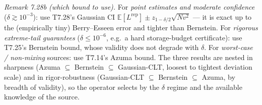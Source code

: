 \documentclass[
]{article}
\begin{document}
\emph{Remark 7.28b (which bound to use).} For \emph{point estimates and
moderate confidence} ($\delta \gtrsim 10^{-3}$): use T7.28's Gaussian
CI $\mathbb{E}[L^{\mathrm{rep}}] \pm z_{1-\delta/2}\sqrt{N v^2}$ --- it
is exact up to the (empirically tiny) Berry--Esseen error and tighter
than Bernstein. For \emph{rigorous extreme-tail guarantees}
($\delta \leq 10^{-6}$, e.g.\ a hard storage-budget certificate): use
T7.25's Bernstein bound, whose validity does not degrade with $\delta$.
For \emph{worst-case / non-mixing} sources: use T7.14's Azuma bound.
The three results are nested in sharpness (Azuma $\subseteq$ Bernstein
$\subseteq$ Gaussian-CLT, loosest to tightest deviation scale) and in
rigor-robustness (Gaussian-CLT $\subseteq$ Bernstein $\subseteq$ Azuma,
by breadth of validity), so the operator selects by the $\delta$ regime
and the available knowledge of the source.
\end{document}
